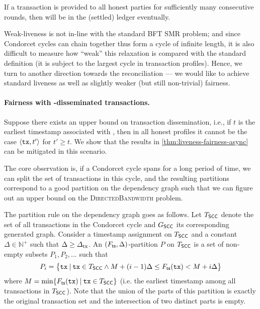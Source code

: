 \begin{definition}
    If a transaction \tx is provided to all honest parties for sufficiently many consecutive rounds, then \tx will be in the (settled) ledger eventually.
\end{definition}

Weak-liveness is not in-line with the standard BFT SMR problem; and since Condorcet cycles can chain together thus form a cycle of infinite length, it is also difficult to measure how ``weak'' this relaxation is compared with the standard definition (it is subject to the largest cycle in transaction profiles).
%
Hence, we turn to another direction towards the reconciliation --- we would like to achieve standard liveness as well as slightly weaker (but still non-trivial) fairness.

\paragraph{Fairness with \txDelay-disseminated transactions.}
%
Suppose there exists an upper bound \txDelay on transaction dissemination, i.e., if $t$ is the earliest timestamp associated with \tx, then in all honest profiles it cannot be the case $\langle \mathtt{tx}, t' \rangle$ for $t' \ge t$.
%
We show that the results in \cref{thm:liveness-fairness-async} can be mitigated in this scenario.

The core observation is, if a Condorcet cycle spans for a long period of time, we can split the set of transactions in this cycle, and the resulting partitions correspond to a good partition on the dependency graph such that we can figure out an upper bound on the \textsc{DirectedBandwidth} problem.

The partition rule on the dependency graph goes as follows.
%
Let $T_\mathsf{SCC}$ denote the set of all transactions in the Condorcet cycle and $G_\mathsf{SCC}$ its corresponding generated graph.
%
Consider a timestamp assignment \mapTimestamp on $T_\mathsf{SCC}$ and a constant $\Delta \in \mathbb{N}^+$ such that $\Delta \ge \varDelta_{\mathrm{tx}}$.
%
An $(F_{\mathsf{ts}}, \Delta)$-partition $P$ on $T_\mathsf{SCC}$ is a set of non-empty subsets  $P_1,  P_2, \ldots$ such that
%
\[ P_i = \big\{\mathtt{tx} \mathbin| \mathtt{tx} \in T_\mathsf{SCC} \wedge M + (i - 1) \Delta \le F_{\mathsf{ts}}(\mathtt{tx}) < M + i \Delta  \big\} \]
%
where $M = \min \{F_{\mathsf{ts}}(\mathtt{tx}) \mathbin| \mathtt{tx} \in T_\mathsf{SCC}\}$ (i.e. the earliest timestamp among all transactions in $T_\mathsf{SCC}$).
%
Note that the union of the parts of this partition is exactly the original transaction set and the intersection of two distinct parts is empty.

